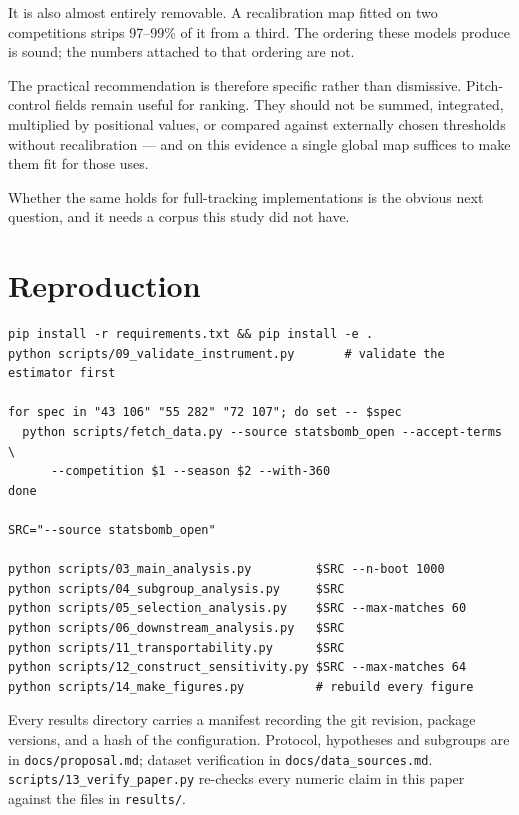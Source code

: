 \documentclass[11pt,a4paper]{article}
\begin{document}
It is also almost entirely removable. A recalibration map fitted on two
competitions strips 97--99\% of it from a third. The ordering these models
produce is sound; the numbers attached to that ordering are not.

The practical recommendation is therefore specific rather than dismissive.
Pitch-control fields remain useful for ranking. They should not be summed,
integrated, multiplied by positional values, or compared against externally
chosen thresholds without recalibration --- and on this evidence a single global
map suffices to make them fit for those uses.

Whether the same holds for full-tracking implementations is the obvious next
question, and it needs a corpus this study did not have.

\appendix
\section{Reproduction}

\begin{verbatim}
pip install -r requirements.txt && pip install -e .
python scripts/09_validate_instrument.py       # validate the estimator first

for spec in "43 106" "55 282" "72 107"; do set -- $spec
  python scripts/fetch_data.py --source statsbomb_open --accept-terms \
      --competition $1 --season $2 --with-360
done

SRC="--source statsbomb_open"

python scripts/03_main_analysis.py         $SRC --n-boot 1000
python scripts/04_subgroup_analysis.py     $SRC
python scripts/05_selection_analysis.py    $SRC --max-matches 60
python scripts/06_downstream_analysis.py   $SRC
python scripts/11_transportability.py      $SRC
python scripts/12_construct_sensitivity.py $SRC --max-matches 64
python scripts/14_make_figures.py          # rebuild every figure
\end{verbatim}

Every results directory carries a manifest recording the git revision, package
versions, and a hash of the configuration. Protocol, hypotheses and subgroups are
in \texttt{docs/proposal.md}; dataset verification in
\texttt{docs/data\_sources.md}. \texttt{scripts/13\_verify\_paper.py} re-checks
every numeric claim in this paper against the files in \texttt{results/}.



\end{document}
